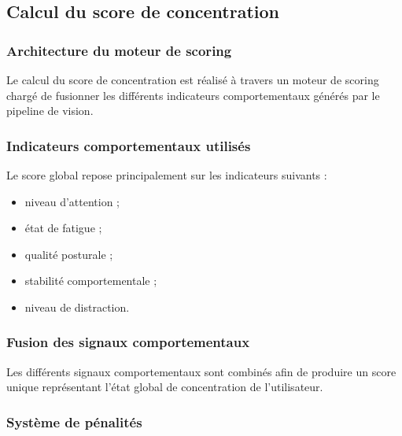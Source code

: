 \subsection{Calcul du score de concentration}

\subsubsection{Architecture du moteur de scoring}

Le calcul du score de concentration est réalisé à travers un moteur de scoring chargé de fusionner les différents indicateurs comportementaux générés par le pipeline de vision.


\subsubsection{Indicateurs comportementaux utilisés}

Le score global repose principalement sur les indicateurs suivants :

\begin{itemize}
    \item niveau d’attention ;
    
    \item état de fatigue ;
    
    \item qualité posturale ;
    
    \item stabilité comportementale ;
    
    \item niveau de distraction.
\end{itemize}


\subsubsection{Fusion des signaux comportementaux}

Les différents signaux comportementaux sont combinés afin de produire un score unique représentant l’état global de concentration de l’utilisateur.


\subsubsection{Système de pénalités}

